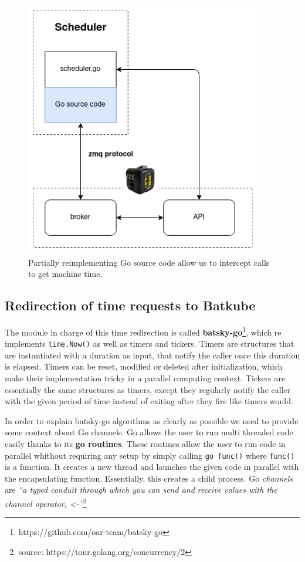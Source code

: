 \begin{figure}[]
	\centering
	\includegraphics[scale=0.75]{imgs/time-hijack-Go.png}
	\caption{Partially reimplementing Go source code allow us to intercept calls to get machine time.}
	\label{fig:patch-time}
\end{figure}

\subsection{Redirection of time requests to Batkube}

The module in charge of this time redirection is called
\textbf{batsky-go}\footnote{https://github.com/oar-team/batsky-go}, which re
implements \texttt{time.Now()} as well as timers and tickers. Timers are
structures that are instantiated with a duration as input, that notify the
caller once this duration is elapsed. Timers can be reset, modified or deleted
after initialization, which make their implementation tricky in a parallel
computing context. Tickers are essentially the same structures as timers,
except they regularly notify the caller with the given period of time instead
of exiting after they fire like timers would.

In order to explain batsky-go algorithms as clearly as possible we need to
provide some context about Go channels. Go allows the user to run multi
threaded code easily thanks to its \textbf{go routines}. These routines allow
the user to run code in parallel whithout requiring any setup by simply calling
\texttt{go func()} where \texttt{func()} is a function.  It creates a new
thread and launches the given code in parallel with the encapsulating function.
Essentially, this creates a child process.  Go \textit{channels} are
\textit{``a typed conduit through which you can send and receive values with
the channel operator, <-''}\footnote{source:
https://tour.golang.org/concurrency/2}

